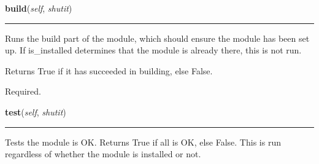     \label{shutit_module:ShutItModule:build}

    \vspace{0.5ex}

\hspace{.8\funcindent}\begin{boxedminipage}{\funcwidth}

    \raggedright \textbf{build}(\textit{self}, \textit{shutit})

    \vspace{-1.5ex}

    \rule{\textwidth}{0.5\fboxrule}
\setlength{\parskip}{2ex}
    Runs the build part of the module, which should ensure the module has 
    been set up. If is\_installed determines that the module is already 
    there, this is not run.

    Returns True if it has succeeded in building, else False.

    Required.

\setlength{\parskip}{1ex}
    \end{boxedminipage}

    \label{shutit_module:ShutItModule:test}

    \vspace{0.5ex}

\hspace{.8\funcindent}\begin{boxedminipage}{\funcwidth}

    \raggedright \textbf{test}(\textit{self}, \textit{shutit})

    \vspace{-1.5ex}

    \rule{\textwidth}{0.5\fboxrule}
\setlength{\parskip}{2ex}
    Tests the module is OK. Returns True if all is OK, else False. This is 
    run regardless of whether the module is installed or not.

\setlength{\parskip}{1ex}
    \end{boxedminipage}

    \label{shutit_module:ShutItModule:finalize}

    \vspace{0.5ex}

